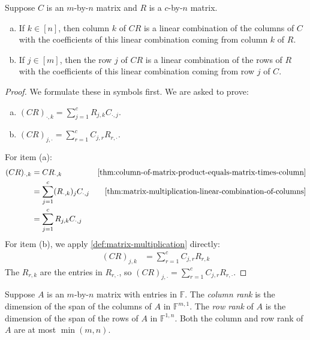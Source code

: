 \documentclass{article}
\begin{document}
\begin{theorem}
  \label{thm:matrix-multiplication-as-linear-combination-of-columns}
  Suppose $C$ is an $m$-by-$n$ matrix and $R$ is a $c$-by-$n$ matrix.
  \begin{enumerate}[(a)]
    \item If $k \in [n]$, then column $k$ of $CR$ is a linear combination of
    the columns of $C$ with the coefficients of this linear
    combination coming from column $k$ of $R$.
    \item If $j \in [m]$, then the row $j$ of $CR$ is a linear
      combination of the rows of $R$ with the coefficients of this
      linear combination coming from row $j$ of $C$.
  \end{enumerate}
\end{theorem}
\begin{proof}
  We formulate these in symbols first. We are asked to prove:
  \begin{enumerate}[(a)]
  \item $(CR)_{\cdot, k} = \sum_{j=1}^c R_{j, k}C_{\cdot, j}$.
  \item $(CR)_{j, \cdot} = \sum_{r=1}^c C_{j, r}R_{r, \cdot}$.
  \end{enumerate}

  For item (a):
  \begin{align*}
    (CR)_{\cdot, k} &= CR_{\cdot, k} &
                                       \cref{thm:column-of-matrix-product-equals-matrix-times-column} \\
    &= \sum_{j=1}^c (R_{\cdot, k})_j C_{\cdot, j} &
                                                    \cref{thm:matrix-multiplication-linear-combination-of-columns}
    \\
    &= \sum_{j=1}^c R_{j, k} C_{\cdot, j} \\
  \end{align*}
  For item (b), we apply \cref{def:matrix-multiplication} directly:
  \begin{align*}
    (CR)_{j, k} &= \sum_{r=1}^c C_{j, r} R_{r, k}
  \end{align*}
  The $R_{r, k}$ are the entries in $R_{r, \cdot}$, so $(CR)_{j,
    \cdot} = \sum_{r=1}^c C_{j, r} R_{r, \cdot}$.
  
\end{proof}

\begin{definition}
  \label{def:column-row-rank}
  Suppose $A$ is an $m$-by-$n$ matrix with entries in
  $\mathbb{F}$. The \textit{column rank} is the dimension of the span
  of the columns of $A$ in $\mathbb{F}^{m, 1}$. The \textit{row rank}
  of $A$ is the dimension of the span of the rows of $A$ in
  $\mathbb{F}^{1, n}$. Both the column and row rank of $A$ are at most
  $\min(m, n)$.
\end{definition}
\end{document}
